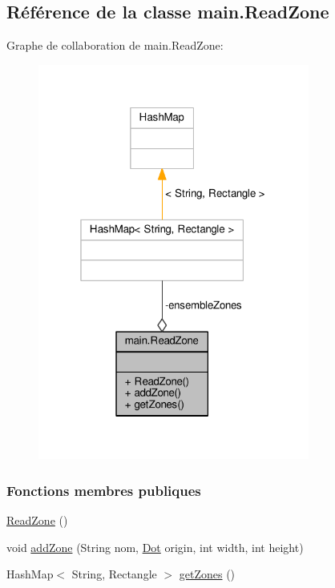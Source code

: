 \hypertarget{classmain_1_1ReadZone}{}\subsection{Référence de la classe main.\+Read\+Zone}
\label{classmain_1_1ReadZone}


Graphe de collaboration de main.\+Read\+Zone\+:\nopagebreak
\begin{figure}[H]
\begin{center}
\leavevmode
\includegraphics[width=253pt]{classmain_1_1ReadZone__coll__graph}
\end{center}
\end{figure}
\subsubsection*{Fonctions membres publiques}
\begin{DoxyCompactItemize}
\item 
\hyperlink{classmain_1_1ReadZone_a4a154c5e019dbeb1c6e57fd9a6ec9a2b}{Read\+Zone} ()
\item 
void \hyperlink{classmain_1_1ReadZone_a7e15ad634ac892871bf7207b7e10cffe}{add\+Zone} (String nom, \hyperlink{classmain_1_1Dot}{Dot} origin, int width, int height)
\item 
Hash\+Map$<$ String, Rectangle $>$ \hyperlink{classmain_1_1ReadZone_a060b745d9dac448790df108839cc670f}{get\+Zones} ()
\end{DoxyCompactItemize}
